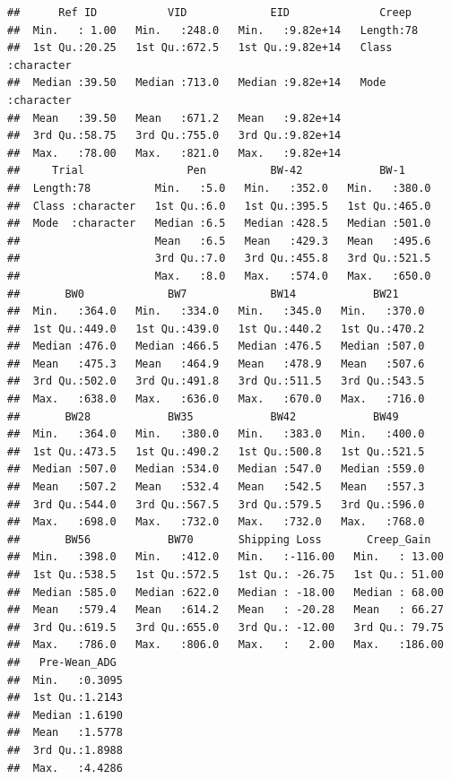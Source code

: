 \documentclass[
]{book}
\begin{document}
\begin{verbatim}
##      Ref ID           VID             EID              Creep          
##  Min.   : 1.00   Min.   :248.0   Min.   :9.82e+14   Length:78         
##  1st Qu.:20.25   1st Qu.:672.5   1st Qu.:9.82e+14   Class :character  
##  Median :39.50   Median :713.0   Median :9.82e+14   Mode  :character  
##  Mean   :39.50   Mean   :671.2   Mean   :9.82e+14                     
##  3rd Qu.:58.75   3rd Qu.:755.0   3rd Qu.:9.82e+14                     
##  Max.   :78.00   Max.   :821.0   Max.   :9.82e+14                     
##     Trial                Pen          BW-42            BW-1      
##  Length:78          Min.   :5.0   Min.   :352.0   Min.   :380.0  
##  Class :character   1st Qu.:6.0   1st Qu.:395.5   1st Qu.:465.0  
##  Mode  :character   Median :6.5   Median :428.5   Median :501.0  
##                     Mean   :6.5   Mean   :429.3   Mean   :495.6  
##                     3rd Qu.:7.0   3rd Qu.:455.8   3rd Qu.:521.5  
##                     Max.   :8.0   Max.   :574.0   Max.   :650.0  
##       BW0             BW7             BW14            BW21      
##  Min.   :364.0   Min.   :334.0   Min.   :345.0   Min.   :370.0  
##  1st Qu.:449.0   1st Qu.:439.0   1st Qu.:440.2   1st Qu.:470.2  
##  Median :476.0   Median :466.5   Median :476.5   Median :507.0  
##  Mean   :475.3   Mean   :464.9   Mean   :478.9   Mean   :507.6  
##  3rd Qu.:502.0   3rd Qu.:491.8   3rd Qu.:511.5   3rd Qu.:543.5  
##  Max.   :638.0   Max.   :636.0   Max.   :670.0   Max.   :716.0  
##       BW28            BW35            BW42            BW49      
##  Min.   :364.0   Min.   :380.0   Min.   :383.0   Min.   :400.0  
##  1st Qu.:473.5   1st Qu.:490.2   1st Qu.:500.8   1st Qu.:521.5  
##  Median :507.0   Median :534.0   Median :547.0   Median :559.0  
##  Mean   :507.2   Mean   :532.4   Mean   :542.5   Mean   :557.3  
##  3rd Qu.:544.0   3rd Qu.:567.5   3rd Qu.:579.5   3rd Qu.:596.0  
##  Max.   :698.0   Max.   :732.0   Max.   :732.0   Max.   :768.0  
##       BW56            BW70       Shipping Loss       Creep_Gain    
##  Min.   :398.0   Min.   :412.0   Min.   :-116.00   Min.   : 13.00  
##  1st Qu.:538.5   1st Qu.:572.5   1st Qu.: -26.75   1st Qu.: 51.00  
##  Median :585.0   Median :622.0   Median : -18.00   Median : 68.00  
##  Mean   :579.4   Mean   :614.2   Mean   : -20.28   Mean   : 66.27  
##  3rd Qu.:619.5   3rd Qu.:655.0   3rd Qu.: -12.00   3rd Qu.: 79.75  
##  Max.   :786.0   Max.   :806.0   Max.   :   2.00   Max.   :186.00  
##   Pre-Wean_ADG   
##  Min.   :0.3095  
##  1st Qu.:1.2143  
##  Median :1.6190  
##  Mean   :1.5778  
##  3rd Qu.:1.8988  
##  Max.   :4.4286
\end{verbatim}
\end{document}
